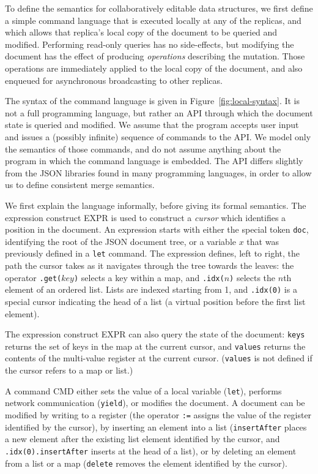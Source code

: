\documentclass[10pt,journal,compsoc]{IEEEtran}
\begin{document}
To define the semantics for collaboratively editable data structures, we first define a simple command language that is executed locally at any of the replicas, and which allows that replica's local copy of the document to be queried and modified. Performing read-only queries has no side-effects, but modifying the document has the effect of producing \emph{operations} describing the mutation. Those operations are immediately applied to the local copy of the document, and also enqueued for asynchronous broadcasting to other replicas.

The syntax of the command language is given in Figure~\ref{fig:local-syntax}. It is not a full programming language, but rather an API through which the document state is queried and modified. We assume that the program accepts user input and issues a (possibly infinite) sequence of commands to the API. We model only the semantics of those commands, and do not assume anything about the program in which the command language is embedded. The API differs slightly from the JSON libraries found in many programming languages, in order to allow us to define consistent merge semantics.

We first explain the language informally, before giving its formal semantics. The expression construct EXPR is used to construct a \emph{cursor} which identifies a position in the document. An expression starts with either the special token \texttt{doc}, identifying the root of the JSON document tree, or a variable $x$ that was previously defined in a \texttt{let} command. The expression defines, left to right, the path the cursor takes as it navigates through the tree towards the leaves: the operator \texttt{.get(}$\mathit{key}$\texttt{)} selects a key within a map, and \texttt{.idx(}$n$\texttt{)} selects the $n$th element of an ordered list. Lists are indexed starting from 1, and \texttt{.idx(0)} is a special cursor indicating the head of a list (a virtual position before the first list element).

The expression construct EXPR can also query the state of the document: \texttt{keys} returns the set of keys in the map at the current cursor, and \texttt{values} returns the contents of the multi-value register at the current cursor. (\texttt{values} is not defined if the cursor refers to a map or list.)

A command CMD either sets the value of a local variable (\texttt{let}), performs network communication (\texttt{yield}), or modifies the document. A document can be modified by writing to a register (the operator \texttt{:=} assigns the value of the register identified by the cursor), by inserting an element into a list (\texttt{insertAfter} places a new element after the existing list element identified by the cursor, and \texttt{.idx(0).insertAfter} inserts at the head of a list), or by deleting an element from a list or a map (\texttt{delete} removes the element identified by the cursor).
\end{document}
